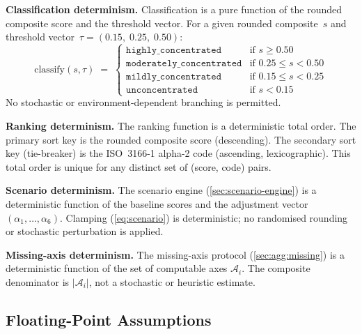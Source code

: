 \begin{description}[style=nextline, leftmargin=3.5em, labelwidth=3em]
  \item[\textbf{D-7}] \textbf{Classification determinism.}\enspace
    Classification is a pure function of the rounded composite score and
    the threshold vector.  For a given rounded composite~\(s\) and threshold
    vector~\(\tau = (0.15,\; 0.25,\; 0.50)\):
    \[
      \mathrm{classify}(s, \tau) \;=\;
      \begin{cases}
        \texttt{highly\_concentrated}     & \text{if } s \geq 0.50 \\
        \texttt{moderately\_concentrated} & \text{if } 0.25 \leq s < 0.50 \\
        \texttt{mildly\_concentrated}     & \text{if } 0.15 \leq s < 0.25 \\
        \texttt{unconcentrated}           & \text{if } s < 0.15
      \end{cases}
    \]
    No stochastic or environment-dependent branching is permitted.

  \item[\textbf{D-8}] \textbf{Ranking determinism.}\enspace
    The ranking function is a deterministic total order.  The primary sort
    key is the rounded composite score (descending).  The secondary sort key
    (tie-breaker) is the ISO~3166-1 alpha-2 code (ascending,
    lexicographic).  This total order is unique for any distinct set of
    (score, code) pairs.

  \item[\textbf{D-9}] \textbf{Scenario determinism.}\enspace
    The scenario engine (\cref{sec:scenario-engine}) is a deterministic
    function of the baseline scores and the adjustment vector
    \((\alpha_1, \ldots, \alpha_6)\).  Clamping (\cref{eq:scenario}) is
    deterministic; no randomised rounding or stochastic perturbation is
    applied.

  \item[\textbf{D-10}] \textbf{Missing-axis determinism.}\enspace
    The missing-axis protocol (\cref{sec:agg:missing}) is a deterministic
    function of the set of computable axes \(\mathcal{A}_i\).  The
    composite denominator is \(|\mathcal{A}_i|\), not a stochastic or
    heuristic estimate.

\end{description}

\subsection{Floating-Point Assumptions}\label{sec:det:floating-point}

